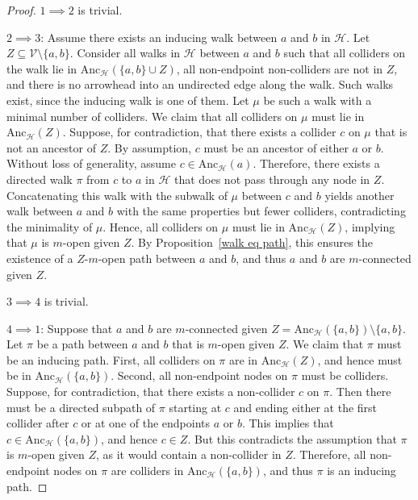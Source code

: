 \documentclass[accepted]{uai2025} %
\newcommand{\anc}{\text{Anc}}
\begin{document}
\inducingPropertyOne*
\begin{proof}
$1 \implies 2$ is trivial.

$2 \implies 3$: Assume there exists an inducing walk between \( a \) and \( b \) in \( \mathcal{H} \). Let \( Z \subseteq  \mathcal{V} \setminus \{a,b\} \). Consider all walks in \( \mathcal{H} \) between \( a \) and \( b \) such that all colliders on the walk lie in \( \anc_{\mathcal{H}}(\{a,b\} \cup Z) \), all non-endpoint non-colliders are not in \( Z \), and there is no arrowhead into an undirected edge along the walk. Such walks exist, since the inducing walk is one of them. Let \( \mu \) be such a walk with a minimal number of colliders. We claim that all colliders on \( \mu \) must lie in \( \anc_{\mathcal{H}}(Z) \). Suppose, for contradiction, that there exists a collider \( c \) on \( \mu \) that is not an ancestor of \( Z \). By assumption, \( c \) must be an ancestor of either \( a \) or \( b \). Without loss of generality, assume \( c \in \anc_{\mathcal{H}}(a) \). Therefore, there exists a directed walk \( \pi \) from \( c \) to \( a \) in \( \mathcal{H} \) that does not pass through any node in \( Z \). Concatenating this walk with the subwalk of \( \mu \) between \( c \) and \( b \) yields another walk between \( a \) and \( b \) with the same properties but fewer colliders, contradicting the minimality of \( \mu \). Hence, all colliders on \( \mu \) must lie in \( \anc_{\mathcal{H}}(Z) \), implying that \( \mu \) is \( m \)-open given \( Z \). By Proposition~\ref{walk eq path}, this ensures the existence of a \( Z \)-\( m \)-open path between \( a \) and \( b \), and thus \( a \) and \( b \) are \( m \)-connected given \( Z \).


$3 \implies 4$ is trivial.

$4 \implies 1$: Suppose that \( a \) and \( b \) are \( m \)-connected given \( Z = \anc_{\mathcal{H}}(\{a,b\})  \setminus \{a,b\} \). Let \( \pi \) be a path between \( a \) and \( b \) that is \( m \)-open given \( Z \). We claim that \( \pi \) must be an inducing path. First, all colliders on \( \pi \) are in \( \anc_{\mathcal{H}}(Z) \), and hence must be in \( \anc_{\mathcal{H}}(\{a,b\}) \). Second, all non-endpoint nodes on \( \pi \) must be colliders. Suppose, for contradiction, that there exists a non-collider \( c \) on \( \pi \). Then there must be a directed subpath of \( \pi \) starting at \( c \) and ending either at the first collider after \( c \) or at one of the endpoints \( a \) or \( b \). This implies that \( c \in \anc_{\mathcal{H}}(\{a,b\}) \), and hence \( c \in Z \). But this contradicts the assumption that \( \pi \) is \( m \)-open given \( Z \), as it would contain a non-collider in \( Z \). Therefore, all non-endpoint nodes on \( \pi \) are colliders in \( \anc_{\mathcal{H}}(\{a,b\}) \), and thus \( \pi \) is an inducing path.
\end{proof}
\end{document}
